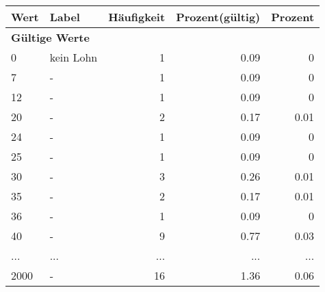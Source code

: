      \begin{longtable}{lXrrr}
     \toprule
     \textbf{Wert} & \textbf{Label} & \textbf{Häufigkeit} & \textbf{Prozent(gültig)} & \textbf{Prozent} \\
     \endhead
     \midrule
     \multicolumn{5}{l}{\textbf{Gültige Werte}}\\
        0 & \multicolumn{1}{X}{kein Lohn} & %
          \num{1} &
          \num[round-mode=places,round-precision=2]{0.09} &
          \num[round-mode=places,round-precision=2]{0} \\
        7 & \multicolumn{1}{X}{-} & %
          \num{1} &
          \num[round-mode=places,round-precision=2]{0.09} &
          \num[round-mode=places,round-precision=2]{0} \\
        12 & \multicolumn{1}{X}{-} & %
          \num{1} &
          \num[round-mode=places,round-precision=2]{0.09} &
          \num[round-mode=places,round-precision=2]{0} \\
        20 & \multicolumn{1}{X}{-} & %
          \num{2} &
          \num[round-mode=places,round-precision=2]{0.17} &
          \num[round-mode=places,round-precision=2]{0.01} \\
        24 & \multicolumn{1}{X}{-} & %
          \num{1} &
          \num[round-mode=places,round-precision=2]{0.09} &
          \num[round-mode=places,round-precision=2]{0} \\
        25 & \multicolumn{1}{X}{-} & %
          \num{1} &
          \num[round-mode=places,round-precision=2]{0.09} &
          \num[round-mode=places,round-precision=2]{0} \\
        30 & \multicolumn{1}{X}{-} & %
          \num{3} &
          \num[round-mode=places,round-precision=2]{0.26} &
          \num[round-mode=places,round-precision=2]{0.01} \\
        35 & \multicolumn{1}{X}{-} & %
          \num{2} &
          \num[round-mode=places,round-precision=2]{0.17} &
          \num[round-mode=places,round-precision=2]{0.01} \\
        36 & \multicolumn{1}{X}{-} & %
          \num{1} &
          \num[round-mode=places,round-precision=2]{0.09} &
          \num[round-mode=places,round-precision=2]{0} \\
        40 & \multicolumn{1}{X}{-} & %
          \num{9} &
          \num[round-mode=places,round-precision=2]{0.77} &
          \num[round-mode=places,round-precision=2]{0.03} \\
       ... & ... & ... & ... & ... \\
        2000 & \multicolumn{1}{X}{-} & %
          \num{16} &
          \num[round-mode=places,round-precision=2]{1.36} &
          \num[round-mode=places,round-precision=2]{0.06} \\


\end{longtable}
